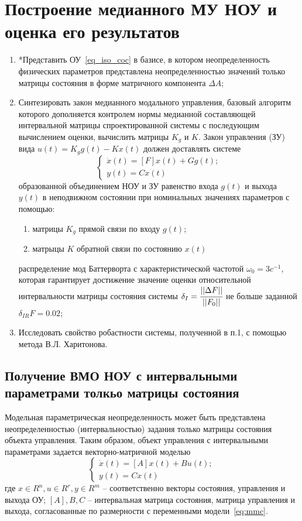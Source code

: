 \section{Построение медианного МУ НОУ и оценка его результатов}

\begin{enumerate}
	\item *Представить ОУ~\ref{eq_iso_coc} в базисе, в котором 	неопределенность физических параметров представлена 	неопределенностью значений только матрицы состояния в	форме матричного компонента $\Delta A$;  
	\item Синтезировать закон медианного модального управления, базовый алгоритм которого дополняется контролем нормы  медианной составляющей интервальной матрицы  спроектированной системы с последующим вычислением оценки, вычислить матрицы $K_g$ и $K$. 
	Закон управления (ЗУ) вида $u(t) = K_g g(t)-K x(t)$ должен доставлять системе
	\begin{equation}
		\begin{cases}
			\dot x (t) = [F] x(t) + G g(t);\\
			y(t) = C x(t)
		\end{cases}
	\end{equation}
	образованной объединением НОУ и ЗУ равенство входа $g(t)$ и выхода $y(t)$ в неподвижном состоянии при номинальных значениях параметров с помощью:
	\begin{enumerate}
		\item матрицы $K_g$ прямой связи по входу $g(t)$;
		\item матрыцы $K$ обратной связи по состоянию $x(t)$
	\end{enumerate}
	распределение мод Баттерворта с характеристической частотой $\omega_0 = 3c^{-1}$, которая гарантирует достижение значение оценки относительной интервальности матрицы состояния системы $\delta_I = \cfrac{||\Delta F||}{||F_0||}$ не больше заданной $\delta_{IR}F = 0.02$; 
	\item Исследовать свойство робастности системы, полученной в п.1, с помощью метода В.Л. Харитонова.
\end{enumerate}

\subsection{Получение ВМО НОУ с интервальными параметрами толкьо матрицы состояния}

Модельная параметрическая неопределенность может быть представлена неопределенностью (интервальностью) задания только матрицы состояния объекта управления. Таким образом, объект управления с интервальными параметрами задается векторно-матричной моделью
\begin{equation}\label{eq:mmc}
	\begin{cases}
		\dot x (t) = [A] x(t) + B u(t);\\
		y(t) = C x(t)
	\end{cases}
\end{equation}
где $x \in R^n, u \in R^r, y \in R^m$ -- соответственно векторы состояния, управления и выхода ОУ; $[A], B, C$ -- интервальная матрица состояния, матрица управления и выхода, согласованные по размерности с переменными модели~\ref{eq:mmc}.

